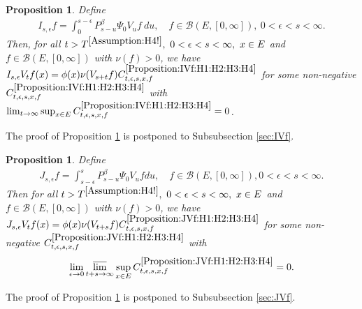 \documentclass[12pt,a4paper]{amsart}
\numberwithin{equation}{section}
\theoremstyle{plain}
\newtheorem{prop}[thm]{Proposition}
\theoremstyle{definition}
\theoremstyle{remark}
\newcounter{N}
\newcounter{n}[N]
\begin{document}
\begin{prop} \label{Proposition:IVf:H1:H2:H3:H4}
	Define
\begin{align}
	I_{s,\epsilon} f
 	= \int_0^{s - \epsilon} P_{s - u}^\beta \Psi_0 V_u f ~du,
 	\quad f\in \mathcal B(E,[0,\infty]),~0 < \epsilon < s < \infty.
\end{align}
	Then, for all $t> T^{\ref{Assumption:H4!}},~0<\epsilon<s< \infty,~x\in E$ and $f\in \mathcal B(E,[0,\infty])$ with $\nu(f)>0$, we have $I_{s,\epsilon}V_t f(x) = \phi(x) \nu(V_{s+t} f) C^{\ref{Proposition:IVf:H1:H2:H3:H4}}_{t,\epsilon, s, x,f}$ for some non-negative $C^{\ref{Proposition:IVf:H1:H2:H3:H4}}_{t,\epsilon, s, x,f}$ with $\lim_{t\to \infty} \sup_{x\in E} C^{\ref{Proposition:IVf:H1:H2:H3:H4}}_{t,\epsilon, s, x,f} = 0$.
\end{prop}

The proof of Proposition \ref{Proposition:IVf:H1:H2:H3:H4} is postponed to Subsubsection \ref{sec:IVf}.

\begin{prop} \label{Proposition:JVf:H1:H2:H3:H4}
	Define
\begin{align}
	J_{s,\epsilon} f
 	= \int_{s-\epsilon}^s P_{s-u}^\beta \Psi_0 V_u f du,
 	\quad f\in \mathcal B(E,[0,\infty]), 0< \epsilon < s< \infty.
\end{align}
	Then for all $t>T^{\ref{Assumption:H4!}},~0<\epsilon<s< \infty,~x\in E$ and $f\in \mathcal B(E,[0,\infty])$ with $\nu(f)>0$, we have $ J_{s,\epsilon} V_tf(x) = \phi(x) \nu(V_{t+s}f) C^{\ref{Proposition:JVf:H1:H2:H3:H4}}_{t,\epsilon,s,x,f}$ for some non-negative $C^{\ref{Proposition:JVf:H1:H2:H3:H4}}_{t,\epsilon,s,x,f}$ with \[\lim_{\epsilon \to 0}\varlimsup_{t+s\to \infty} \sup_{x\in E} C^{\ref{Proposition:JVf:H1:H2:H3:H4}}_{t,\epsilon,s,x,f} =0.\]
\end{prop}

The proof of Proposition \ref{Proposition:JVf:H1:H2:H3:H4} is postponed to Subsubsection \ref{sec:JVf}.
\end{document}
